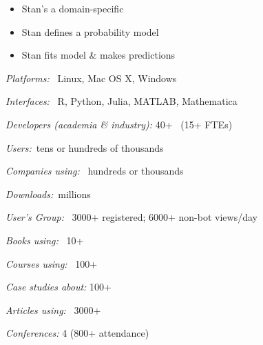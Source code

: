 \documentclass[10pt]{report}
\begin{document}

%
\begin{itemize}
\item Stan's a domain-specific 
\item Stan  defines a  probability model
\item Stan  fits model \& makes predictions
\end{itemize}


\begin{subitemize}
\item \textit{Platforms:} \ Linux, Mac OS X, Windows
\vspace*{-4pt}
\item \textit{Interfaces:} \ R, Python, Julia, MATLAB, Mathematica
\vspace*{-4pt}
\item \textit{Developers (academia \& industry):} 40+ \ {\small (15+ FTEs)}
\vspace*{-4pt}
\item \textit{Users:}\ tens or hundreds of thousands
\vspace*{-4pt}
\item \textit{Companies using:} \ hundreds or thousands
\vspace*{-4pt}
\item \textit{Downloads:}\ millions
\vspace*{-4pt}
\item \textit{User's Group:} \ 3000+ registered; 6000+ non-bot views/day
\vspace*{-4pt}
\item \textit{Books using:} \ 10+
\vspace*{-4pt}
\item \textit{Courses using:} \ 100+
\vspace*{-4pt}
\item \textit{Case studies about:} 100+
\vspace*{-4pt}
\item \textit{Articles using:} \ 3000+
\vspace*{-4pt}
\item \textit{Conferences:} 4 (800+ attendance)
\end{subitemize}
\end{document}
